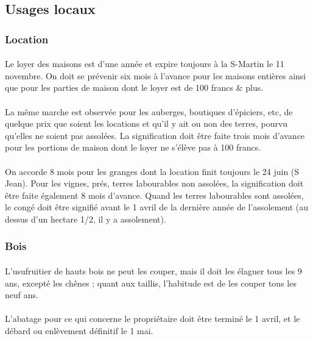 \documentclass[../eBook.tex]{subfiles}
\begin{document}
  \newpage
  \subsection*{Usages locaux}
    \subsubsection*{Location}
      \paragraph{}Le loyer des maisons est d'une année et expire toujours à la S-Martin le 11 novembre. On doit se prévenir six mois à l'avance pour les maisons entières ainsi que pour les parties de maison dont le loyer est de 100 francs \& plus.
      \paragraph{}La même marche est observée pour les auberges, boutiques d'épiciers, etc, de quelque prix que soient les locations et qu'il y ait ou non des terres, pourvu qu'elles ne soient pas assolées. La signification doit être faite trois mois d'avance pour les portions de maison dont le loyer ne s'élève pas à 100 francs.
      \paragraph{}On accorde 8 mois pour les granges dont la location finit toujours le 24 juin (S Jean). Pour les vignes, prés, terres labourables non assolées, la signification doit être faite également 8 mois d'avance. Quand les terres labourables sont assolées, le congé doit être signifié avant le 1 avril de la dernière année de l'assolement (au dessus d'un hectare 1/2, il y a assolement).

    \subsubsection*{Bois}
      \paragraph{}L'usufruitier de hauts bois ne peut les couper, mais il doit les élaguer tous les 9 ans, excepté les chênes ; quant aux taillis, l'habitude est de les couper tous les neuf ans.
      \paragraph{}L'abatage pour ce qui concerne le propriétaire doit être terminé le 1 avril, et le débard ou enlèvement définitif le 1 mai.
\end{document}
